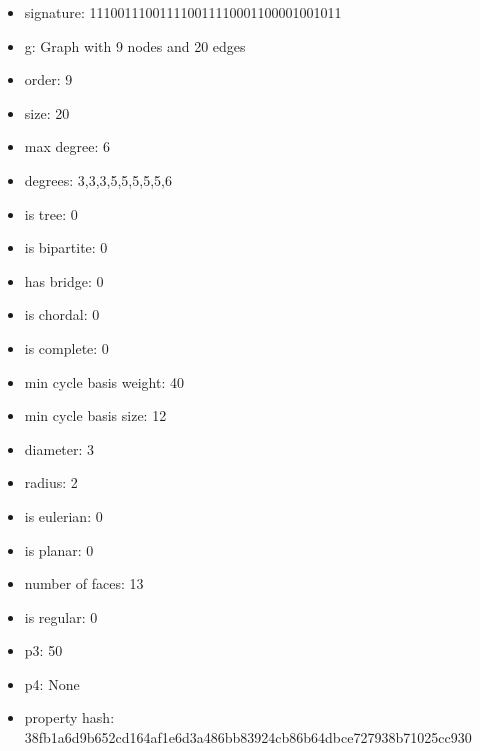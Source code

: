 \newpage
\begin{figure}
\end{figure}
\begin{itemize}
\item signature: 111001110011110011110001100001001011
\item g: Graph with 9 nodes and 20 edges
\item order: 9
\item size: 20
\item max degree: 6
\item degrees: 3,3,3,5,5,5,5,5,6
\item is tree: 0
\item is bipartite: 0
\item has bridge: 0
\item is chordal: 0
\item is complete: 0
\item min cycle basis weight: 40
\item min cycle basis size: 12
\item diameter: 3
\item radius: 2
\item is eulerian: 0
\item is planar: 0
\item number of faces: 13
\item is regular: 0
\item p3: 50
\item p4: None
\item property hash: 38fb1a6d9b652cd164af1e6d3a486bb83924cb86b64dbce727938b71025cc930
\end{itemize}
